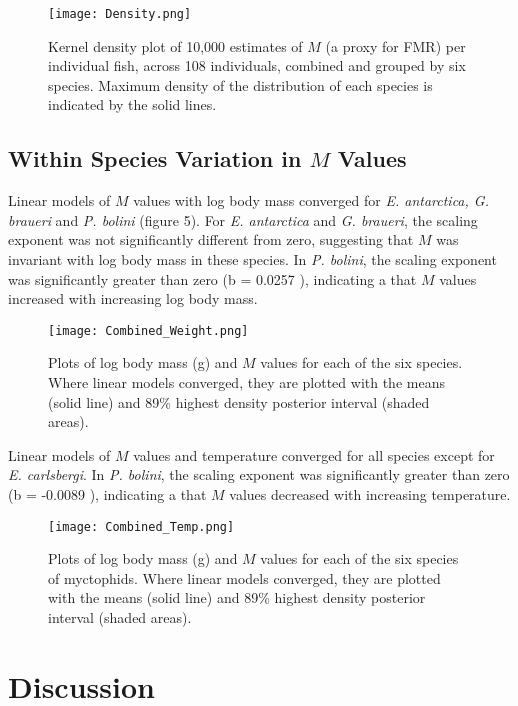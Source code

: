 \documentclass[12pt, titlepage]{article}
\begin{document}
\begin{figure}[H]
\texttt{[image: Density.png]}
\caption{Kernel density plot of 10,000 estimates of $M$ (a proxy for FMR) per individual fish, across 108 individuals, combined and grouped by six species. Maximum density of the distribution of each species is indicated by the solid lines.}
\end{figure}

\pagebreak
\subsection{Within Species Variation in $M$ Values}

Linear models of $M$ values with log body mass converged for \textit{E. antarctica, G. braueri} and \textit{P. bolini} (figure 5).
For \textit{E. antarctica} and \textit{G. braueri}, the scaling exponent was not significantly different from zero, suggesting that $M$ was invariant with log body mass in these species.
In \textit{P. bolini}, the scaling exponent was significantly greater than zero (b = 0.0257 ), indicating a that $M$ values increased with increasing log body mass.

\begin{figure}[H]
\texttt{[image: Combined\_Weight.png]}
\caption{Plots of log body mass (g) and $M$ values for each of the six species. Where linear models converged, they are plotted with the means (solid line) and 89\% highest density posterior interval (shaded areas).}
\end{figure}

Linear models of $M$ values and temperature converged for all species except for \textit{E. carlsbergi}.
In \textit{P. bolini}, the scaling exponent was significantly greater than zero (b = -0.0089 ), indicating a that $M$ values decreased with increasing temperature.

\begin{figure}[H]
\texttt{[image: Combined\_Temp.png]}
\caption{Plots of log body mass (g) and $M$ values for each of the six species of myctophids. Where linear models converged, they are plotted with the means (solid line) and 89\% highest density posterior interval (shaded areas).}
\end{figure}

\pagebreak
\section{Discussion}
\end{document}
